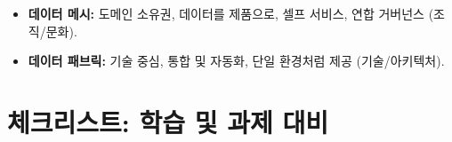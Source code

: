 \documentclass[11pt,a4paper]{article}
\theoremstyle{definition}
\begin{document}
\begin{tcolorbox}[title=\textbf{데이터 아키텍처 패러다임}, colback=purple!5!white, colframe=purple!75!black, sharp corners, boxrule=0.8pt]
\begin{itemize}
    \item \textbf{데이터 메시:} 도메인 소유권, 데이터를 제품으로, 셀프 서비스, 연합 거버넌스 (조직/문화).
    \item \textbf{데이터 패브릭:} 기술 중심, 통합 및 자동화, 단일 환경처럼 제공 (기술/아키텍처).
\end{itemize}
\end{tcolorbox}

\newpage
\section{체크리스트: 학습 및 과제 대비}
\end{document}
